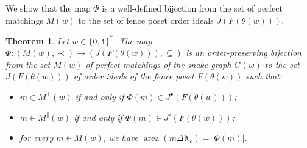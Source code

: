 \documentclass[a4paper,12pt]{amsart}
\newtheorem{theorem}[definition]{Theorem}
\newcommand{\bfrak}{{\mathfrak{b}}}
\newcommand{\0}{\mathtt{0}}
\newcommand{\1}{\mathtt{1}}
\newcommand{\2}{\mathtt{2}}
\newcommand{\3}{\mathtt{3}}
\newcommand{\carreplein}{{\perp}}
\newcommand{\carrevide}{{\parallel}}
\DeclareMathOperator{\area}{area}
\newcommand{\size}[1]{
    {|#1|}                 %
}
\begin{document}
We show that the map $\Phi$ is a well-defined bijection
from the set of perfect matchings $M(w)$ to the set of fence poset order ideals $J(F(\theta(w)))$.


\begin{theorem}\label{theo:bij}
Let $w\in\{\0,\1\}^*$.
The map $\Phi:(M(w),\prec)\to (J(F(\theta(w))), \subseteq)$
is an order-preserving bijection from
the set $M(w)$ of perfect matchings of the snake graph $G(w)$
to
    the set $J(F(\theta(w)))$ of order ideals of the fence poset $F(\theta(w))$
such that:
\begin{itemize}
    \item $m\in M^\carreplein(w)$ if and only if $\Phi(m)\in J^\bullet(F(\theta(w)))$;
    \item $m\in M^\carrevide(w)$ if and only if  $\Phi(m)\in J^\circ(F(\theta(w)))$;
    \item for every $m\in M(w)$, we have $\area(m\Delta\bfrak_w) = \size{\Phi(m)}.$
\end{itemize}
\end{theorem}

\def\firstVertEdge{u^|}
\def\firstHorizEdge{u^-}
\end{document}
